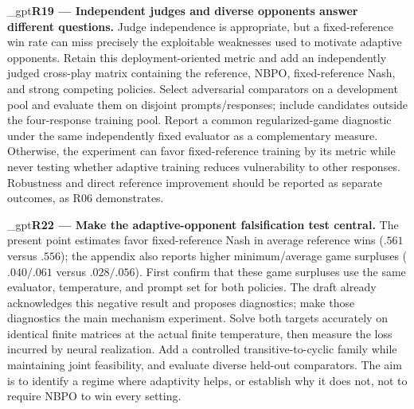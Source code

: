 \documentclass{article}
\newif\ifshowreviews
\newcommand{\reviewresponse}[1]{%
  \ifshowreviews
  \par\begingroup\color{blue!65!black}\hypersetup{allcolors=blue!65!black}\emergencystretch=2em%
  \noindent\textbf{Response:} #1\par\endgroup
  \fi}
\theoremstyle{remark}
\theoremstyle{plain}
\begin{document}
\kekim_gpt{\textbf{R19 --- Independent judges and diverse opponents answer different questions.} Judge independence is appropriate, but a fixed-reference win rate can miss precisely the exploitable weaknesses used to motivate adaptive opponents. Retain this deployment-oriented metric and add an independently judged cross-play matrix containing the reference, NBPO, fixed-reference Nash, and strong competing policies. Select adversarial comparators on a development pool and evaluate them on disjoint prompts/responses; include candidates outside the four-response training pool. Report a common regularized-game diagnostic under the same independently fixed evaluator as a complementary measure. Otherwise, the experiment can favor fixed-reference training by its metric while never testing whether adaptive training reduces vulnerability to other responses. Robustness and direct reference improvement should be reported as separate outcomes, as R06 demonstrates.}
\reviewresponse{\textbf{R19 --- Partially addressed.} The four-policy cross-play bank and objective-wise matrices are measured, with distinct reference, worst-bank, and regularized-bank statistics. The summary has unequal valid denominators and requires a common-set paired comparison. Stronger external comparators remain pending; finite-bank performance is not population exploitability.}

\kekim_gpt{\textbf{R22 --- Make the adaptive-opponent falsification test central.} The present point estimates favor fixed-reference Nash in average reference wins ($.561$ versus $.556$); the appendix also reports higher minimum/average game surpluses ($.040/.061$ versus $.028/.056$). First confirm that these game surpluses use the same evaluator, temperature, and prompt set for both policies. The draft already acknowledges this negative result and proposes diagnostics; make those diagnostics the main mechanism experiment. Solve both targets accurately on identical finite matrices at the actual finite temperature, then measure the loss incurred by neural realization. Add a controlled transitive-to-cyclic family while maintaining joint feasibility, and evaluate diverse held-out comparators. The aim is to identify a regime where adaptivity helps, or establish why it does not, not to require NBPO to win every setting.}
\reviewresponse{\textbf{R22 --- Partially addressed.} Controlled results retain Game-utilitarian and Game-KS to distinguish representation from Nash-specific effects. Natural cross-play is reported descriptively; common-set paired inference and an independent exact-target versus neural-policy comparison remain needed. Historical contrary results are not treated as reconciled.}
\end{document}
